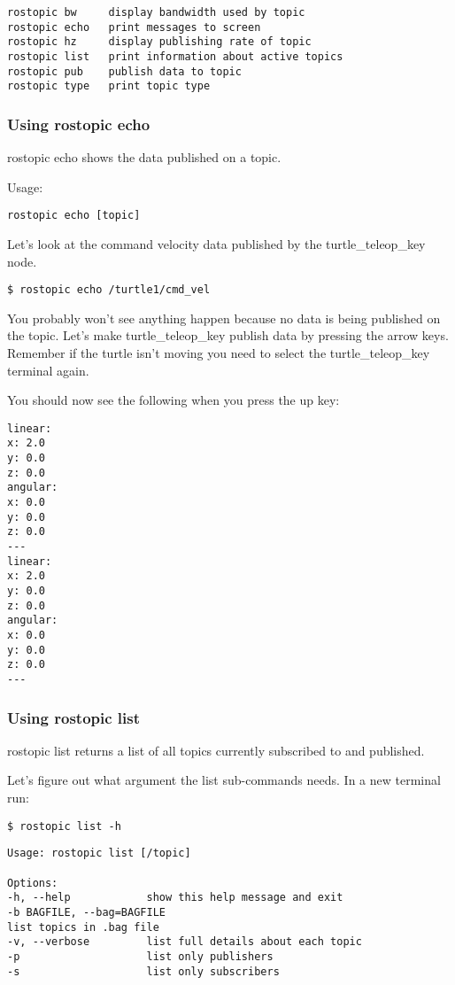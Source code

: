 \begin{lstlisting}[breaklines=true languages=bash]
rostopic bw     display bandwidth used by topic
rostopic echo   print messages to screen
rostopic hz     display publishing rate of topic    
rostopic list   print information about active topics
rostopic pub    publish data to topic
rostopic type   print topic type
\end{lstlisting}

\subsubsection{Using rostopic echo}
rostopic echo shows the data published on a topic.

Usage:
\begin{lstlisting}[breaklines=true languages=bash]
rostopic echo [topic]
\end{lstlisting}

Let's look at the command velocity data published by the turtle\_teleop\_key node.

\begin{lstlisting}[breaklines=true languages=bash]
$ rostopic echo /turtle1/cmd_vel
\end{lstlisting}

You probably won't see anything happen because no data is being published on the topic. Let's make turtle\_teleop\_key publish data by pressing the arrow keys. Remember if the turtle isn't moving you need to select the turtle\_teleop\_key terminal again.

You should now see the following when you press the up key:
\begin{lstlisting}[breaklines=true languages=bash]
linear: 
x: 2.0
y: 0.0
z: 0.0
angular: 
x: 0.0
y: 0.0
z: 0.0
---
linear: 
x: 2.0
y: 0.0
z: 0.0
angular: 
x: 0.0
y: 0.0
z: 0.0
---
\end{lstlisting}

\subsubsection{Using rostopic list}
rostopic list returns a list of all topics currently subscribed to and published.

Let's figure out what argument the list sub-commands needs. In a new terminal run:
\begin{lstlisting}[breaklines=true languages=bash]
$ rostopic list -h
\end{lstlisting}

\begin{lstlisting}[breaklines=true languages=bash]
Usage: rostopic list [/topic]

Options:
-h, --help            show this help message and exit
-b BAGFILE, --bag=BAGFILE
list topics in .bag file
-v, --verbose         list full details about each topic
-p                    list only publishers
-s                    list only subscribers
\end{lstlisting}

